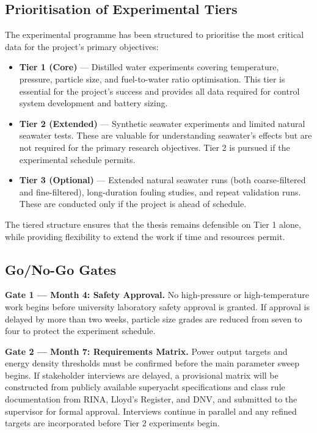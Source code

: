 \documentclass[12pt]{article}
\begin{document}
\subsection*{Prioritisation of Experimental Tiers}

The experimental programme has been structured to prioritise the most critical
data for the project's primary objectives:

\begin{itemize}
    \item \textbf{Tier 1 (Core)} --- Distilled water experiments covering temperature,
    pressure, particle size, and fuel-to-water ratio optimisation. This tier is essential for the project's success and
    provides all data required for control system development and battery sizing.

    \item \textbf{Tier 2 (Extended)} --- Synthetic seawater experiments and limited
    natural seawater tests. These are valuable for understanding seawater's effects
    but are not required for the primary research objectives. Tier 2 is pursued if
    the experimental schedule permits.

    \item \textbf{Tier 3 (Optional)} --- Extended natural seawater runs (both
    coarse-filtered and fine-filtered), long-duration fouling studies, and repeat
    validation runs. These are conducted only if the project is ahead of schedule.
\end{itemize}

The tiered structure ensures that the thesis remains defensible on Tier 1 alone,
while providing flexibility to extend the work if time and resources permit.

\subsection*{Go/No-Go Gates}

\noindent\textbf{Gate 1 --- Month 4: Safety Approval.} No high-pressure or high-temperature work
begins before university laboratory safety approval is granted. If approval is
delayed by more than two weeks, particle size grades are reduced from seven to four
to protect the experiment schedule.

\medskip
\noindent\textbf{Gate 2 --- Month 7: Requirements Matrix.} Power output targets and energy density
thresholds must be confirmed before the main parameter sweep begins. If stakeholder
interviews are delayed, a provisional matrix will be constructed from publicly
available superyacht specifications and class rule documentation from RINA, Lloyd's
Register, and DNV, and submitted to the supervisor for formal approval. Interviews
continue in parallel and any refined targets are incorporated before Tier 2
experiments begin.
\end{document}
